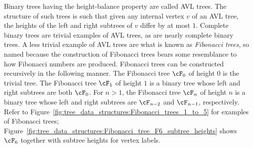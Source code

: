 Binary trees having the height-balance property are called
AVL trees. The structure of such trees is such that
given any internal vertex $v$ of an AVL tree, the heights of the left
and right subtrees of $v$ differ by at most $1$.
Complete binary trees are trivial examples
of AVL trees, as are nearly
complete binary trees. A less trivial example of AVL trees are what is
known as \emph{Fibonacci trees}, so named
because the construction of Fibonacci trees bears some resemblance to
how Fibonacci numbers are produced. Fibonacci
trees can be constructed recursively in the following manner. The
Fibonacci tree $\cF_0$ of height $0$ is the trivial tree. The
Fibonacci tree $\cF_1$ of height $1$ is a binary tree whose left and
right subtrees are both $\cF_0$. For $n > 1$, the Fibonacci tree
$\cF_n$ of height $n$ is a binary tree whose left and right subtrees
are $\cF_{n-2}$ and $\cF_{n-1}$, respectively. Refer to
Figure~\ref{fig:tree_data_structures:Fibonacci_trees_1_to_5} for
examples of Fibonacci trees;
Figure~\ref{fig:tree_data_structures:Fibonacci_tree_F6_subtree_heights}
shows $\cF_6$ together with subtree heights for vertex labels.

